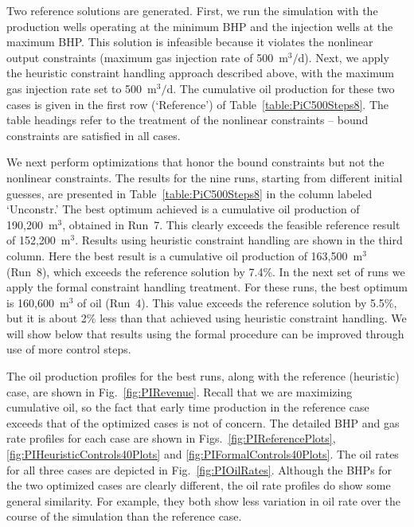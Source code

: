 \documentclass[twocolumn,numbook]{svjour3}          %
\begin{document}
Two reference solutions are generated. First, we run the
simulation with the production wells operating at the minimum BHP and the
injection wells at the maximum BHP. This solution is infeasible because it
violates the nonlinear output constraints (maximum gas injection rate of 500~m$^3/$d). Next, we apply the heuristic
constraint handling approach described above, with the maximum gas injection
rate set to 500~m$^3/$d. The cumulative oil production for these two cases is
given in the first row (`Reference') of Table~\ref{table:PiC500Steps8}. %
The table headings refer to the treatment of the
nonlinear constraints -- bound constraints are satisfied in all cases.


We next perform optimizations that honor the bound constraints but not the
nonlinear constraints. The results for the nine runs, starting from different
initial guesses, are presented in Table~\ref{table:PiC500Steps8} in the column
labeled `Unconstr.' The best optimum achieved is a cumulative oil production of 190,200~m$^3$, obtained in Run~7.  This clearly exceeds the feasible reference result
of 152,200~m$^3$. Results using heuristic constraint handling are shown in
the third column. Here the best result is a cumulative oil production of 163,500~m$^3$ (Run~8), which exceeds the reference solution by 7.4\%. In the next set of runs we apply the formal constraint handling treatment. For
these runs, the best optimum is 160,600~m$^3$ of oil (Run~4). This value exceeds the reference solution by 5.5\%, but it is about 2\% less than that achieved using heuristic constraint handling. We will show below that results using the formal procedure can be improved through use of more control steps.


The oil production profiles for the best runs, along with the reference
(heuristic) case, are shown in Fig.~\ref{fig:PIRevenue}. Recall that
we are maximizing cumulative oil, so the fact that early time production in the
reference case exceeds that of the optimized cases is not of concern. The
detailed BHP and gas rate profiles for each case are shown in Figs.~\ref{fig:PIReferencePlots},
\ref{fig:PIHeuristicControls40Plots} and \ref{fig:PIFormalControls40Plots}. The oil rates for all three cases are depicted in Fig.~\ref{fig:PIOilRates}. Although the BHPs for the two
optimized cases are clearly different, the oil rate profiles do show some general
similarity. For example, they both show less variation in oil rate over the course of the simulation than the reference case.
\end{document}
